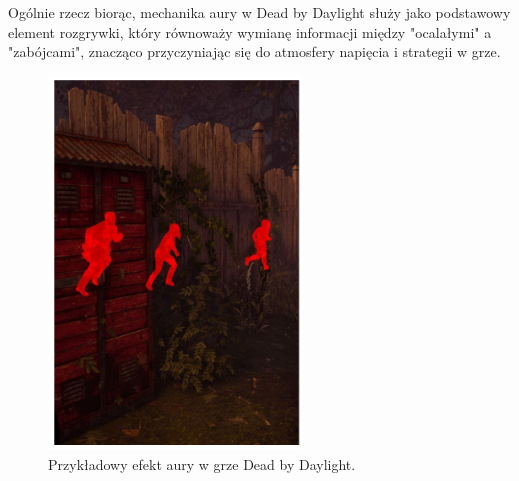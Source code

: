 Ogólnie rzecz biorąc, mechanika aury w Dead by Daylight służy jako podstawowy element rozgrywki,
który równoważy wymianę informacji między "ocalałymi" a "zabójcami", znacząco przyczyniając się do atmosfery napięcia i strategii w grze.

\begin{figure}[h]
\centering
\includegraphics[width=0.6\textwidth]{images/dbd}
\caption{Przykładowy efekt aury w grze Dead by Daylight.}
\end{figure}

